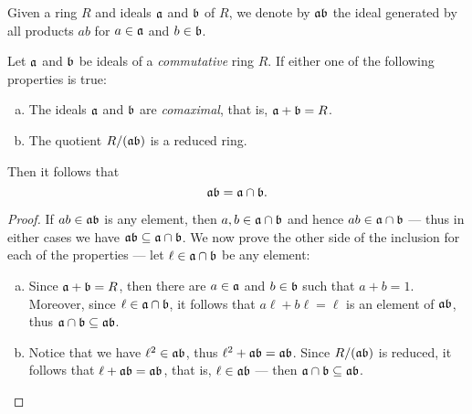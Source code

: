 \begin{definition}
\label{def:product-ideal}
Given a ring \(R\) and ideals \(\mathfrak{a}\) and \(\mathfrak{b}\) of \(R\), we
denote by \(\mathfrak{a b}\) the ideal generated by all products \(a b\) for \(a
\in \mathfrak{a}\) and \(b \in \mathfrak{b}\).
\end{definition}

\begin{lemma}
\label{lem:}
Let \(\mathfrak{a}\) and \(\mathfrak{b}\) be ideals of a \emph{commutative} ring
\(R\). If either one of the following properties is true:
\begin{enumerate}[(a)]\setlength\itemsep{0em}
\item The ideals \(\mathfrak{a}\) and \(\mathfrak{b}\) are \emph{comaximal}, that is,
  \(\mathfrak{a} + \mathfrak{b} = R\).

\item The quotient \(R/(\mathfrak{a b})\) is a reduced ring.
\end{enumerate}
Then it follows that
\[
\mathfrak{a b} = \mathfrak{a} \cap \mathfrak{b}.
\]
\end{lemma}

\begin{proof}
If \(a b \in \mathfrak{a b}\) is any element, then
\(a, b \in \mathfrak{a} \cap \mathfrak{b}\) and hence
\(a b \in \mathfrak{a} \cap \mathfrak{b}\) --- thus in either cases we have
\(\mathfrak{a b} \subseteq \mathfrak{a} \cap \mathfrak{b}\). We now prove the other side
of the inclusion for each of the properties --- let
\(\ell \in \mathfrak{a} \cap \mathfrak{b}\) be any element:
\begin{enumerate}[(a)]\setlength\itemsep{0em}
\item Since \(\mathfrak{a} + \mathfrak{b} = R\), then there are \(a \in \mathfrak{a}\)
  and \(b \in \mathfrak{b}\) such that \(a + b = 1\). Moreover, since
  \(\ell \in \mathfrak{a} \cap \mathfrak{b}\), it follows that
  \(a \ell + b \ell = \ell\) is an element of \(\mathfrak{a b}\), thus
  \(\mathfrak{a} \cap \mathfrak{b} \subseteq \mathfrak{a b}\).

\item Notice that we have \(\ell^2 \in \mathfrak{a b}\), thus
  \(\ell^2 + \mathfrak{a b} = \mathfrak{a b}\). Since \(R/(\mathfrak{a b})\) is reduced,
  it follows that \(\ell + \mathfrak{a b} = \mathfrak{a b}\), that is, \(\ell \in
  \mathfrak{a b}\) --- then \(\mathfrak{a} \cap \mathfrak{b} \subseteq \mathfrak{a b}\).
\end{enumerate}
\end{proof}




